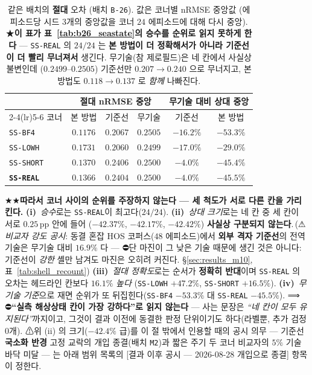 \documentclass[11pt]{report}
\numberwithin{equation}{chapter}
\numberwithin{figure}{chapter}
\numberwithin{table}{chapter}
\newcommand{\CmpSkill}{\,(⚠\emph{비교자 강도 공시}: 동결 혼잡 HOS 코퍼스($48$ 에피소드)에서
\textbf{외부 격자 기준선}의 전역 기술은 무기술 대비 $16.9\%$ 다 --- ⛔단 마진이 그 낮은
기술 때문에 생긴 것은 아니다: 기준선이 \emph{강한} 셸만 남겨도 마진은 오히려 커진다.
\S\ref{sec:results_m10}, 표~\ref{tab:shell_recount})}
\begin{document}
\begin{table}[htbp]
\centering
\caption{같은 배치의 \textbf{절대} 오차 (배치 \texttt{B-26}). 값은 코너별 nRMSE 중앙값
(에피소드당 시드 $3$개의 중앙값을 코너 $24$ 에피소드에 대해 다시 중앙).
★\textbf{이 표가 표~\ref{tab:b26_seastate}의 승수를 순위로 읽지 못하게 한다} ---
\texttt{SS-REAL} 의 $24/24$ 는 \textbf{본 방법이 더 정확해서가 아니라 기준선이 더 빨리
무너져서} 생긴다. 무기술(참 제로필드)은 네 칸에서 사실상 불변인데
($0.2499$--$0.2505$) 기준선만 $0.207 \to 0.240$ 으로 무너지고, 본 방법도
$0.118 \to 0.137$ 로 \emph{함께} 나빠진다.}
\label{tab:b26_absolute}
\begin{tabular}{lccccc}
\toprule
 & \multicolumn{3}{c}{절대 nRMSE 중앙} & \multicolumn{2}{c}{무기술 대비 상대 중앙} \\
\cmidrule(lr){2-4}\cmidrule(lr){5-6}
코너 & 본 방법 & 기준선 & 무기술 & 기준선 & 본 방법 \\
\midrule
\texttt{SS-BF4}   & $\mathbf{0.1176}$ & $0.2067$ & $0.2505$ & $-16.2\%$ & $\mathbf{-53.3\%}$ \\
\texttt{SS-LOWH}  & $0.1731$ & $0.2060$ & $0.2499$ & $-17.0\%$ & $-29.0\%$ \\
\texttt{SS-SHORT} & $0.1370$ & $0.2406$ & $0.2500$ & $-4.0\%$  & $-45.4\%$ \\
\textbf{\texttt{SS-REAL}} & $0.1366$ & $0.2404$ & $0.2500$ & $\mathbf{-4.0\%}$ & $-45.5\%$ \\
\bottomrule
\end{tabular}
\end{table}

★★\textbf{따라서 코너 사이의 순위를 주장하지 않는다 --- 세 척도가 서로 다른 칸을
가리킨다.} \textbf{(i)}~\emph{승수}로는 \texttt{SS-REAL}이 최고다($24/24$).
\textbf{(ii)}~\emph{상대 크기}로는 네 칸 중 세 칸이 서로 $0.25$\,pp 안에 들어
($-42.37\%$, $-42.17\%$, $-42.42\%$) \textbf{사실상 구분되지 않는다}.\CmpSkill{}
\textbf{(iii)}~\emph{절대 정확도}로는 순서가 \textbf{정확히 반대}이며
\texttt{SS-REAL} 의 오차는 헤드라인 칸보다 $16.1\%$ \emph{높다}
(\texttt{SS-LOWH} $+47.2\%$, \texttt{SS-SHORT} $+16.5\%$).
\textbf{(iv)}~\emph{무기술 기준}으로 재면 순위가 또 뒤집힌다(\texttt{SS-BF4} $-53.3\%$
대 \texttt{SS-REAL} $-45.5\%$). ⟹ ⛔\textbf{``실측 해상상태 칸이 가장 강하다''로 읽지
않는다} --- 사는 문장은 \emph{``네 칸이 모두 유지된다''}까지이고, 그것이 결과 이전에
동결한 판정 단위이기도 하다(라벨뿐, 추가 검정 $0$개).
⚠위 (ii) 의 크기($-42.4\%$ 급)를 이 절 밖에서 인용할 때의 공시 의무 --- 기준선
\textbf{국소화 반경} 고정 교락의
개입 종결(배치 \texttt{M2})과 짧은 주기 두 코너 비교자의 $5\%$ 기술 바닥 미달 --- 는
아래 범위 목록의 [결과 이후 공시 --- 2026-08-28 개입으로 종결] 항목이 정한다.
\end{document}
